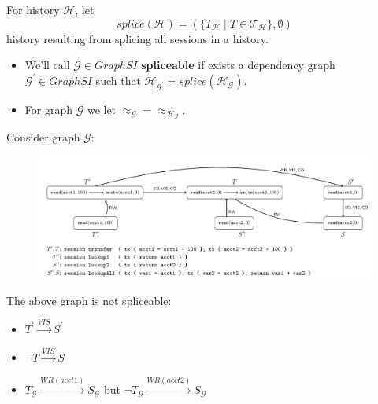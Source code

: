 \documentclass{beamer}
\begin{document}
\begin{frame}
	\begin{definition}
		For history $\mathcal{H}$, let 
		$$ splice(\mathcal{H})=\left( \{ \boxed{T}_\mathcal{H} \mid T \in \mathcal{T}_\mathcal{H} \}, \emptyset \right) $$
		history resulting from splicing all sessions in a history.
	\end{definition}
	\begin{itemize}
		\item We'll call $\mathcal{G} \in GraphSI $ \textbf{spliceable} if exists a dependency graph $ \mathcal{G}^\prime \in GraphSI $ such that $ \mathcal{H}_{\mathcal{G}^\prime} = splice(\mathcal{H}_\mathcal{G})$.
		\item For graph $\mathcal{G}$ we let $\approx_\mathcal{G} = \approx_{\mathcal{H}_\mathcal{G}}$.
	\end{itemize}
\end{frame}

\begin{frame}
	Consider graph $\mathcal{G}$:
	\begin{figure}
		\includegraphics[scale=0.28]{fig4}
	\end{figure}
	\begin{example}
		The above graph is not spliceable:
		\begin{itemize}
			\item $T^\prime \xrightarrow{VIS} S^\prime$
			\item $\neg T \xrightarrow{VIS} S$
			\item $\boxed{T}_\mathcal{G} \xrightarrow{WR(acct1)} \boxed{S}_\mathcal{G}$ but $\neg \boxed{T}_\mathcal{G} \xrightarrow{WR(acct2)} \boxed{S}_\mathcal{G}$
		\end{itemize}
	\end{example}
\end{frame}
\end{document}
